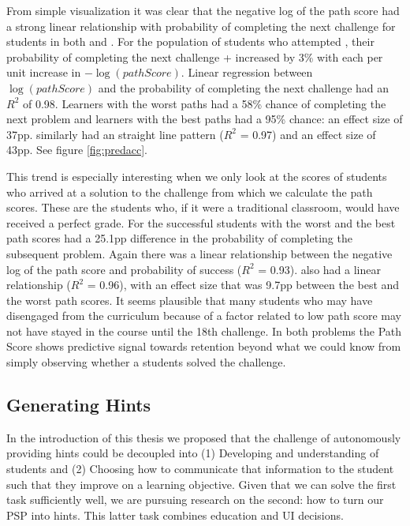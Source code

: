 From simple visualization it was clear that the negative log of the path score had a strong linear relationship with probability of completing the next challenge for students in both \Pa and \Pb\hspace{-0.5mm}. For the population of students who attempted \Pa, their probability of completing the next challenge \Pa\hspace{-0.5mm}+ increased by 3\% with each per unit increase in $-\log(pathScore)$. Linear regression between $\log(pathScore)$ and the probability of completing the next challenge had an $R^2$ of 0.98. Learners with the worst paths had a 58\% chance of completing the next problem and learners with the best paths had a 95\% chance: an effect size of 37pp. \Pb similarly had an straight line pattern ($R^2$ = 0.97) and an effect size of 43pp. See figure \ref{fig:predacc}.

This trend is especially interesting when we only look at the scores of students who arrived at a solution to the challenge from which we calculate the path scores. These are the students who, if it were a traditional classroom, would have received a perfect grade. For \Pa the successful students with the worst and the best path scores had a 25.1pp difference in the probability of completing the subsequent problem. Again there was a linear relationship between the negative log of the path score and probability of success ($R^2$ = 0.93). \Pb also had a linear relationship ($R^2$ = 0.96), with an effect size that was 9.7pp between the best and the worst path scores. It seems plausible that many students who may have disengaged from the curriculum because of a factor related to low path score may not have stayed in the course until the 18th challenge. In both problems the Path Score shows predictive signal towards retention beyond what we could know from simply observing whether a students solved the challenge.

\subsection{Generating Hints}

In the introduction of this thesis we proposed that the challenge of autonomously providing hints could be decoupled into (1) Developing and understanding of students and (2) Choosing how to communicate that information to the student such that they improve on a learning objective. Given that we can solve the first task sufficiently well, we are  pursuing research on the second: how to turn our PSP into hints. This latter task combines education and UI decisions.

